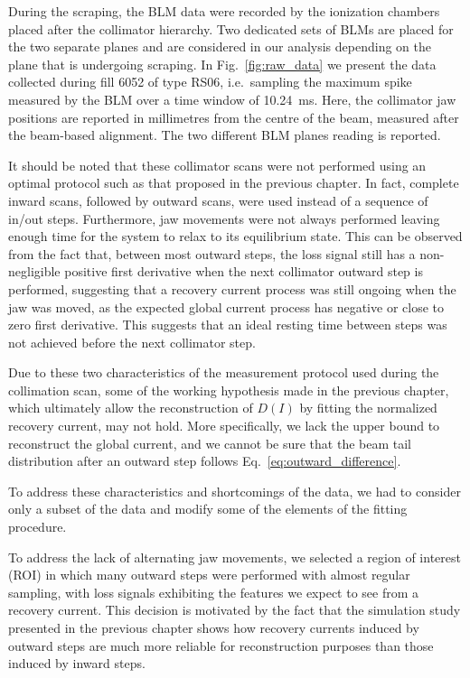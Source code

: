 During the scraping, the BLM data were recorded by the ionization chambers placed after the collimator hierarchy. Two dedicated sets of BLMs are placed for the two separate planes and are considered in our analysis depending on the plane that is undergoing scraping. In Fig.~\ref{fig:raw_data} we present the data collected during fill 6052 of type RS06, i.e.\ sampling the maximum spike measured by the BLM over a time window of \SI{10.24}{ms}. Here, the collimator jaw positions are reported in millimetres from the centre of the beam, measured after the beam-based alignment. The two different BLM planes reading is reported.

It should be noted that these collimator scans were not performed using an optimal protocol such as that proposed in the previous chapter. In fact, complete inward scans, followed by outward scans, were used instead of a sequence of in/out steps. Furthermore, jaw movements were not always performed leaving enough time for the system to relax to its equilibrium state. This can be observed from the fact that, between most outward steps, the loss signal still has a non-negligible positive first derivative when the next collimator outward step is performed, suggesting that a recovery current process was still ongoing when the jaw was moved, as the expected global current process has negative or close to zero first derivative. This suggests that an ideal resting time between steps was not achieved before the next collimator step.

Due to these two characteristics of the measurement protocol used during the collimation scan, some of the working hypothesis made in the previous chapter, which ultimately allow the reconstruction of $D(I)$ by fitting the normalized recovery current, may not hold. More specifically, we lack the upper bound to reconstruct the global current, and we cannot be sure that the beam tail distribution after an outward step follows Eq.~\eqref{eq:outward_difference}.

To address these characteristics and shortcomings of the data, we had to consider only a subset of the data and modify some of the elements of the fitting procedure. 

To address the lack of alternating jaw movements, we selected a region of interest (ROI) in which many outward steps were performed with almost regular sampling, with loss signals exhibiting the features we expect to see from a recovery current. This decision is motivated by the fact that the simulation study presented in the previous chapter shows how recovery currents induced by outward steps are much more reliable for reconstruction purposes than those induced by inward steps. 

